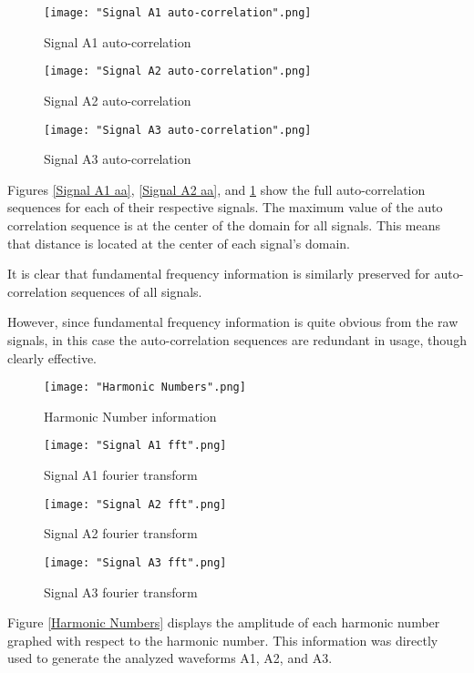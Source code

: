 \documentclass[12pt]{article}
\begin{document}
\begin{figure}[H]
    \texttt{[image: "Signal A1 auto-correlation".png]}
    \caption{Signal A1 auto-correlation}\label{Signal A1 aa}
    \endminipage\hfill
    \texttt{[image: "Signal A2 auto-correlation".png]}
    \caption{Signal A2 auto-correlation}\label{Signal A2 aa}
    \endminipage\hfill
    \texttt{[image: "Signal A3 auto-correlation".png]}
    \caption{Signal A3 auto-correlation}\label{Signal A3 aa}
    \endminipage\hfill
\end{figure}

Figures \ref{Signal A1 aa}, \ref{Signal A2 aa}, and \ref{Signal A3 aa} show the full auto-correlation sequences for each of their respective signals. The maximum value of the auto correlation sequence is at the center of the domain for all signals. This means that distance is located at the center of each signal's domain.\newline

It is clear that fundamental frequency information is similarly preserved for auto-correlation sequences of all signals.\newline

However, since fundamental frequency information is quite obvious from the raw signals, in this case the auto-correlation sequences are redundant in usage, though clearly effective.

\begin{figure}[H]
    \texttt{[image: "Harmonic Numbers".png]}
    \caption{Harmonic Number information}\label{Harmonic Numbers}
    \endminipage\hfill
    \texttt{[image: "Signal A1 fft".png]}
    \caption{Signal A1 fourier transform}\label{Signal A1 fft}
    \endminipage\hfill
    \texttt{[image: "Signal A2 fft".png]}
    \caption{Signal A2 fourier transform}\label{Signal A2 fft}
    \endminipage\hfill
    \texttt{[image: "Signal A3 fft".png]}
    \caption{Signal A3 fourier transform}\label{Signal A3 fft}
    \endminipage\hfill
\end{figure}

Figure \ref{Harmonic Numbers} displays the amplitude of each harmonic number graphed with respect to the harmonic number. This information was directly used to generate the analyzed waveforms A1, A2, and A3.\newline
\end{document}
